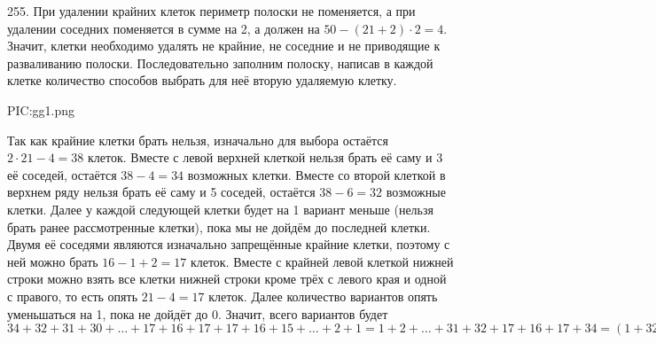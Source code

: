 255. При удалении крайних клеток периметр полоски не поменяется, а при удалении соседних поменяется в сумме на 2, а должен на $50-(21+2)\cdot2=4.$ Значит, клетки необходимо удалять не крайние, не соседние и не приводящие к разваливанию полоски. Последовательно заполним полоску, написав в каждой клетке количество способов выбрать для неё вторую удаляемую клетку.
\begin{center}
{{PIC:gg1.png}}
\end{center}
Так как крайние клетки брать нельзя, изначально для выбора остаётся $2\cdot21-4=38$ клеток. Вместе с левой верхней клеткой нельзя брать её саму и 3 её соседей, остаётся $38-4=34$ возможных клетки. Вместе со второй клеткой в верхнем ряду нельзя брать её саму и 5 соседей, остаётся $38-6=32$ возможные клетки. Далее у каждой следующей клетки будет на 1 вариант меньше (нельзя брать ранее рассмотренные клетки), пока мы не дойдём до последней клетки. Двумя её соседями являются изначально запрещённые крайние клетки, поэтому с ней можно брать $16-1+2=17$ клеток. Вместе с крайней левой клеткой нижней строки можно взять все клетки нижней строки кроме трёх с левого края и одной с правого, то есть опять $21-4=17$ клеток. Далее количество вариантов опять уменьшаться на 1, пока не дойдёт до 0. Значит, всего вариантов будет $34+32+31+30+\ldots+17+16+17+17+16+15+\ldots+2+1=1+2+\ldots+31+32+17+16+17+34=(1+32)+(2+21)+\ldots+(16+17)+84=33\cdot16+84=612.$\\

